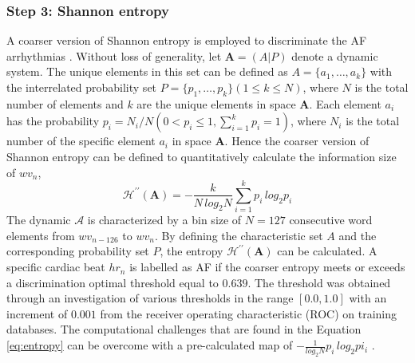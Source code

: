 \subsubsection{Step 3: Shannon entropy}
\label{sec:entropy}
A coarser version of Shannon entropy is employed to discriminate the AF arrhythmias . Without loss of generality, let $\mathbf{A} = (A|P)$ denote a dynamic system. The unique elements in this set can be defined as $A = \{a_1, \ldots, a_k\}$ with the interrelated probability set $P = \{p_1, \ldots, p_k\} (1 \le k \le N)$, where $N$ is the total number of elements and $k$ are the unique elements in space $\mathbf{A}$. Each element $a_i$ has the probability $p_i = N_i/N (0 < p_i \le 1, \sum_{i=1}^{k}p_i=1)$, where $N_i$ is the total number of the specific element $a_i$ in space $\mathbf{A}$. Hence the coarser version of Shannon entropy can be defined to quantitatively calculate the information size of $wv_n$,
\begin{equation}\label{eq:entropy}
\mathcal{H}^{\prime\prime} (\mathbf{A}) = -\frac{k}{N \, log_2 N} \sum_{i=1}^{k}p_i \, log_2 p_i
\end{equation}
The dynamic $\mathcal{A}$ is characterized by a bin size of $N=127$ consecutive word elements from $wv_{n-126}$ to $wv_n$. By defining the characteristic set $A$ and the corresponding probability set $P$, the entropy $\mathcal{H}^{\prime\prime} (\mathbf{A})$ can be calculated. A specific cardiac beat $hr_n$ is labelled as AF if the coarser entropy meets or exceeds a discrimination optimal threshold equal to $0.639$. The threshold was obtained through an investigation of various thresholds in the range $[0.0, 1.0]$ with an increment of $0.001$ from the receiver operating characteristic (ROC) on training databases. 
The computational challenges that are found in the Equation \ref{eq:entropy} can be overcome with a pre-calculated map of $-\frac{1}{log_2 N}p_i \, log_2 pi_i$ \cite[p. 4]{zhou2015}.

